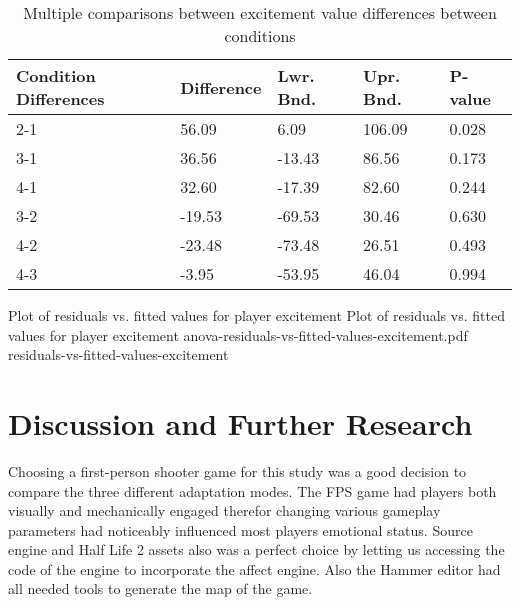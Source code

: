 \documentclass[conference]{IEEEtran}
\begin{document}
\begin{table}[h]
\caption{Multiple comparisons between excitement value differences between conditions}
\label{tbl:pval-cnd-exct}
\centering
\begin{tabular}{lllll}
\hline
Condition Differences &   Difference  &   Lwr. Bnd.      &     Upr. Bnd.   &  P-value     \\
\hline
2-1                   &    56.09      &       6.09       &     106.09      &  0.028       \\
3-1                   &    36.56      &     -13.43       &      86.56      &  0.173       \\
4-1                   &    32.60      &     -17.39       &      82.60      &  0.244       \\
3-2                   &   -19.53      &     -69.53       &      30.46      &  0.630       \\
4-2                   &   -23.48      &     -73.48       &      26.51      &  0.493       \\
4-3                   &    -3.95      &     -53.95       &      46.04      &  0.994       \\
\hline
\end{tabular}
\end{table}

\img
{Plot of residuals vs. fitted values for player excitement}
{Plot of residuals vs. fitted values for player excitement}
{anova-residuals-vs-fitted-values-excitement.pdf}
{residuals-vs-fitted-values-excitement}


\section{Discussion and Further Research}
\label{sec:discus}

Choosing a first-person shooter game for this study was a good decision to compare the three different adaptation modes. The FPS game had players both visually and mechanically engaged therefor changing various gameplay parameters had noticeably influenced most players emotional status. Source engine and Half Life 2 assets also was a perfect choice by letting us accessing the code of the engine to incorporate the affect engine. Also the Hammer editor had all needed tools to generate the map of the game.
\end{document}
